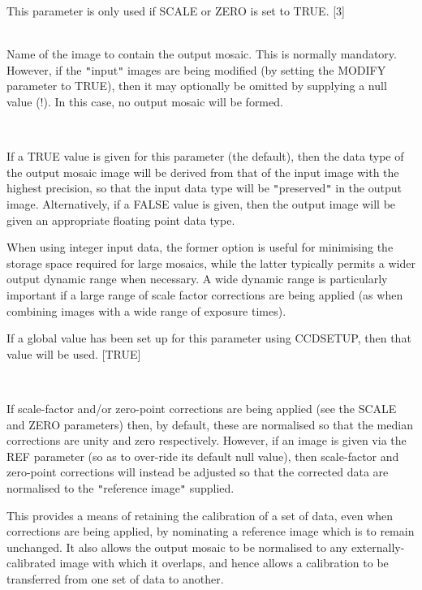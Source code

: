 \documentclass[twoside,11pt]{article}
\newcommand{\htmlref}[2]{#1}
\renewcommand{\_}{\texttt{\symbol{95}}}
\newcommand{\qt}[1]{{\tt "}#1{\tt "}}
\newcommand{\xroutine}[1]{\htmlref{{\sc #1}}{#1}}
\newcommand{\sstsubsection}[1]{ \item[{#1}] \mbox{} \\}
\newcommand{\sstsubsection}[1]{\item[{#1}]}
\begin{document}
{{{         This parameter is only used if SCALE or ZERO is set to TRUE.
         [3]
      }
      \sstsubsection{
         OUT = image (Write)
      } {
         Name of the image to contain the output mosaic. This is normally
         mandatory. However, if the \qt{input} images are being modified (by
         setting the MODIFY parameter to TRUE), then it may optionally
         be omitted by supplying a null value (!). In this case, no
         output mosaic will be formed.
      }
      \sstsubsection{
         PRESERVE = \_LOGICAL (Read)
      } {
         If a TRUE value is given for this parameter (the default),
         then the data type of the output mosaic image will be derived
         from that of the input image with the highest precision, so that
         the input data type will be \qt{preserved} in the output image.
         Alternatively, if a FALSE value is given, then the output image
         will be given an appropriate floating point data type.

         When using integer input data, the former option is useful for
         minimising the storage space required for large mosaics, while
         the latter typically permits a wider output dynamic range when
         necessary. A wide dynamic range is particularly important if a
         large range of scale factor corrections are being applied (as
         when combining images with a wide range of exposure times).

         If a global value has been set up for this parameter using
         \xroutine{CCDSETUP}, then that value will be used.
         [TRUE]
      }
      \sstsubsection{
         REF = image (Read)
      } {
         If scale-factor and/or zero-point corrections are being
         applied (see the SCALE and ZERO parameters) then, by default,
         these are normalised so that the median corrections are unity
         and zero respectively. However, if an image is given via the REF
         parameter (so as to over-ride its default null value), then
         scale-factor and zero-point corrections will instead be
         adjusted so that the corrected data are normalised to the
         \qt{reference image} supplied.

         This provides a means of retaining the calibration of a set of
         data, even when corrections are being applied, by nominating a
         reference image which is to remain unchanged. It also allows the
         output mosaic to be normalised to any externally-calibrated
         image with which it overlaps, and hence allows a calibration to
         be transferred from one set of data to another.

}}}
\end{document}

